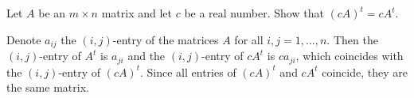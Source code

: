 \documentclass{ximera}
\begin{document}
\begin{exercise} \label{YZ_1.3_transpose2}
Let $A$ be an $m\times n$ matrix and let $c$ be a real number. Show that $(cA)^t=cA^t$.

\begin{solution}
\soln
Denote $a_{ij}$ the $(i,j)$-entry of the matrices $A$ for all  $i,j=1,\ldots,n$. Then the $(i,j)$-entry of $A^t$ is $a_{ji}$ and the $(i,j)$-entry of $cA^t$ is $ca_{ji}$, which coincides with the $(i,j)$-entry of $(cA)^t$. Since all entries of $(cA)^t$ and $cA^t$ coincide, they are the same matrix.
\end{solution}
\end{exercise}
\end{document}
